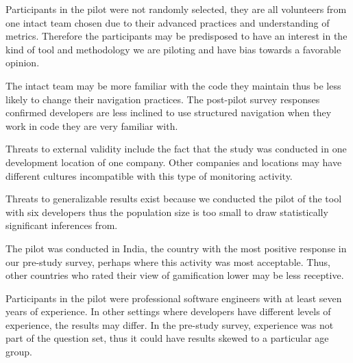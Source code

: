 \documentclass{sig-alternate}
\begin{document}
Participants in the pilot were not randomly selected, they are all volunteers from one intact team chosen due to their advanced practices and understanding of metrics.  Therefore the participants may be predisposed to have an interest in the kind of tool and methodology we are piloting and have bias towards a favorable opinion.  

The intact team may be more familiar with the code they maintain thus be less likely to change their navigation practices.  The post-pilot survey responses confirmed developers are less inclined to use structured navigation when they work in code they are very familiar with.  

Threats to external validity include the fact that the study was conducted in one development location of one company.  Other companies and locations may have different cultures incompatible with this type of monitoring activity.

 Threats to generalizable results exist because we conducted the pilot of the tool with six developers thus the population size is too small to draw statistically significant inferences from. 

 The pilot was conducted in India, the country with the most positive response in our pre-study survey, perhaps where this activity was most acceptable.  Thus, other countries who rated their view of gamification lower may be less receptive. 

Participants in the pilot were professional software engineers with at least seven years of experience.  In other settings where developers have different levels of experience, the results may differ.  In  the pre-study survey, experience was not part of the question set, thus it could have results skewed to a particular age group.
\end{document}
